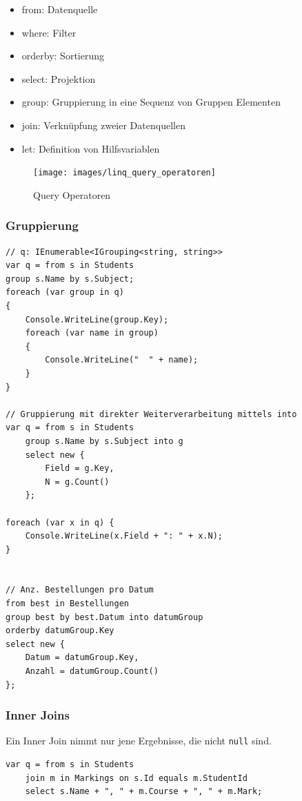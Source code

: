 \begin{itemize}
	\item from: Datenquelle
	\item where: Filter
	\item orderby: Sortierung
	\item select: Projektion
	\item group:  Gruppierung in eine Sequenz von Gruppen Elementen
	\item join: Verknüpfung zweier Datenquellen
	\item let: Definition von Hilfsvariablen
\end{itemize}

\begin{figure}[h]
\centering
\texttt{[image: images/linq\_query\_operatoren]}
\caption{Query Operatoren}
\label{fig:linqqueryoperatoren}
\end{figure}

\newpage

\subsubsection{Gruppierung}
\begin{lstlisting}
// q: IEnumerable<IGrouping<string, string>>
var q = from s in Students
group s.Name by s.Subject;
foreach (var group in q)
{
	Console.WriteLine(group.Key);
	foreach (var name in group)
	{
		Console.WriteLine("  " + name);
	}
}

// Gruppierung mit direkter Weiterverarbeitung mittels into
var q = from s in Students
	group s.Name by s.Subject into g
	select new {
		Field = g.Key,
		N = g.Count()
	};

foreach (var x in q) {
	Console.WriteLine(x.Field + ": " + x.N);
}


// Anz. Bestellungen pro Datum
from best in Bestellungen
group best by best.Datum into datumGroup
orderby datumGroup.Key
select new {
	Datum = datumGroup.Key,
	Anzahl = datumGroup.Count()
};

\end{lstlisting}

\clearpage

\subsubsection{Inner Joins}
Ein Inner Join nimmt nur jene Ergebnisse, die nicht \lstinline|null| sind.
\begin{lstlisting}
var q = from s in Students
	join m in Markings on s.Id equals m.StudentId
	select s.Name + ", " + m.Course + ", " + m.Mark;
\end{lstlisting}

